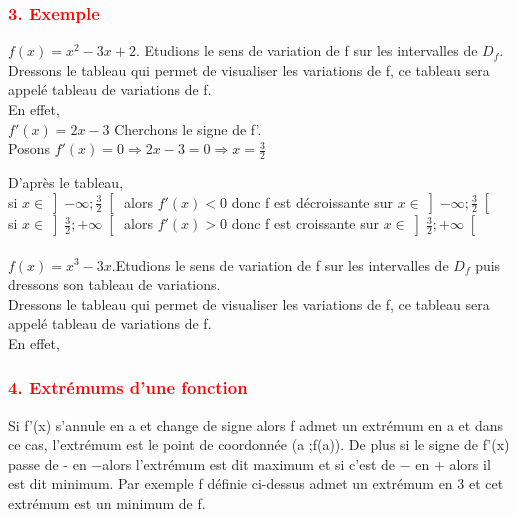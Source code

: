 \documentclass[12pt]{article}
\begin{document}
\subsubsection*{\textcolor{red}{3. Exemple}}
$f(x)=x^{2}-3x+2$. Etudions le sens de variation de f sur les intervalles de $D_{f}$.\\
Dressons le tableau qui permet de visualiser les variations de f, ce tableau sera appelé tableau de variations de f.\\
En effet,\\
$f'(x)=2x-3$ Cherchons le signe de f'.\\
Posons $f'(x)=0 \Longrightarrow 2x-3=0 \Longrightarrow x=\frac{3}{2}$\\
D'après le tableau,\\
si $x \in \left] -\infty;\frac{3}{2} \right[ $ alors $f'(x)<0$ donc f est décroissante sur 
$x \in \left] -\infty;\frac{3}{2} \right[$\\
si $x \in \left]  \frac{3}{2};+\infty \right[$ alors $f'(x)>0$ donc f est croissante sur
$x \in \left]  \frac{3}{2};+\infty \right[$\\\\ 
$f(x)=x^{3}-3x$.Etudions le sens de variation de f sur les intervalles de $D_{f}$
puis dressons son tableau de variations.\\
Dressons le tableau qui permet de visualiser les variations de f, ce tableau sera appelé tableau de variations de f.\\
En effet,\\
\subsubsection*{\textcolor{red}{4. Extrémums d’une fonction}}
Si f'(x) s’annule en a et change de signe alors f admet un extrémum en a et dans ce cas,
l’extrémum est le point de coordonnée (a ;f(a)). De plus si le signe de f'(x) passe de - en $-$alors l’extrémum est dit maximum et si c’est de $-$ en + alors il est dit minimum.
Par exemple f définie ci-dessus admet un extrémum en 3 et cet extrémum est un minimum de
f.
\end{document}
